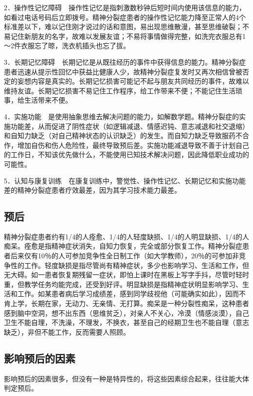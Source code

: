 2．操作性记忆障碍　操作性记忆是指刺激数秒钟后短时间内使用该信息的能力，如看过电话号码后立即拨号。精神分裂症患者的操作性记忆能力降至正常人的4个标准差以下，难以记住刚才说过的话和意图，易出现思维散漫，甚至思维破裂；不易记住新朋友的名字，故难以发展友谊；不易将事情做得完整，如洗完衣服总有1～2件衣服忘了晾，洗衣机插头也忘了拔。

3．长期记忆障碍　长期记忆是从既往经历的事件中获得信息的能力。精神分裂症患者迅速从提示性回忆中获益比健康人少，故精神分裂症复发时又再次相信曾被否定的妄想内容是真实的。长期记忆损害可能记不起与朋友共同经历的事件，故难以维持友谊。长期记忆损害不易记住工作程序，给工作带来不便；不能记住生活琐事，给生活带来不便。

4．实施功能　是使用抽象思维去解决问题的能力，如解数学题。精神分裂症的实施功能差，从而促进了阴性症状（如逻辑减退、情感迟钝、意志减退和社交退缩）和自知力缺乏（对自己精神状态的认识缺乏）的发生。而自知力缺乏导致服药不合作，增加自伤和伤人危险性，最终导致预后差。实施功能减退导致不善于计划自己的工作日，不知该优先做什么，不能使用已知技术解决问题，因此降低职业成功的可能性。

5．认知与康复训练　在康复训练中，警觉性、操作性记忆、长期记忆和实施功能差的精神分裂症患者疗效最差，因为其学习技术能力最差。

\subsection{预后}

精神分裂症患者约有1/4的人痊愈、1/4的人轻度缺损、1/4的人明显缺损、1/4的人痴呆。痊愈是指精神症状消失，自知力恢复，完全或部分恢复工作。精神分裂症患者后来仅有10％的人可参加竞争性全日制工作（如大学教师），20％的可参加非竞争性的工作。轻度缺损是指尽管尚有精神症状，多少也影响学习、生活和工作，但无大碍。如一患者恢复期残留一症状，即怕上课时在黑板上写字手抖，尽管时轻时重，但教学任务均能完成，还受到好评。明显缺损是指精神症状明显影响学习、生活和工作。如某患者病后学习成绩差，感到同学歧视他（可能确实如此），因而不肯上学，长期在家，无动力、无亲情、无打算。痴呆是一种分裂性痴呆，这种患者感到脑中空洞，想不出东西（思维贫乏），对亲人不关心，冷漠（情感淡漠），自己卫生不能自理，不洗澡，不理发，不换衣，甚至自己的经期卫生也不能自理（意志缺乏），非但不能工作，反而需要人照顾。

\subsection{影响预后的因素}

影响预后的因素很多，但没有一种是特异性的，将这些因素综合起来，往往能大体判定预后。

